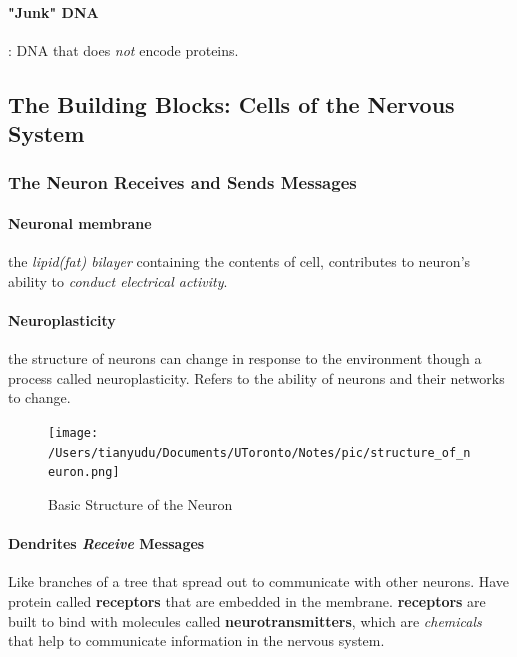\documentclass{article}
\begin{document}
 	\paragraph{"Junk" DNA}: DNA that does \emph{not} encode proteins.
 	\subsection{The Building Blocks: Cells of the Nervous System}
 	\subsubsection{The Neuron Receives and Sends Messages}
 	\paragraph{Neuronal membrane} the \emph{lipid(fat) bilayer} containing the contents of cell, contributes to neuron's ability to \emph{conduct electrical activity}.
 	\paragraph{Neuroplasticity} the structure of neurons can change in response to the environment though a process called neuroplasticity.
 	\newline Refers to the ability of neurons and their networks to change.
 	\begin{figure}[H]
 		\texttt{[image: /Users/tianyudu/Documents/UToronto/Notes/pic/structure\_of\_neuron.png]}
 		\caption{Basic Structure of the Neuron}
 	\end{figure}
 	\paragraph{Dendrites \emph{Receive} Messages} \quad
 	\newline Like branches of a tree that spread out to communicate with other neurons.
 	\newline Have protein called \textbf{receptors} that are embedded in the membrane. \textbf{receptors} are built to bind with molecules called \textbf{neurotransmitters}, which are \emph{chemicals} that help to communicate information in the nervous system.
\end{document}
